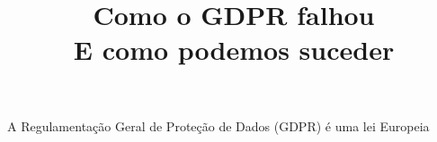 \documentclass[
    article,
    11pt,
    oneside,
    a4paper,
    english,
    brazil,
    sumario=tradicional
    ]{abntex2}
\title{\textbf{Como o GDPR falhou} \\ \Large{E como podemos suceder}}
\begin{document}

\frenchspacing

\maketitle

\textual

A Regulamentação Geral de Proteção de Dados (GDPR) é uma lei Europeia

\pagebreak

\postextual


\end{document}
